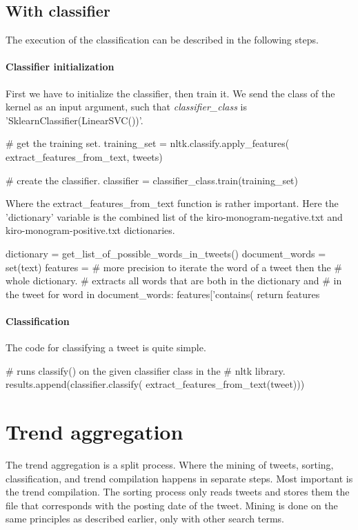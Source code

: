 \subsection{With classifier}\label{code:classifier_classification}
The execution of the classification can be described in the following steps. 

\paragraph{Classifier initialization}
First we have to initialize the classifier, then train it. We send the class of
the kernel as an input argument, such that \textit{classifier\_class} is
'SklearnClassifier(LinearSVC())'.
\begin{python}
# get the training set.
training_set = nltk.classify.apply_features(
    extract_features_from_text,
    tweets)

# create the classifier.
classifier = classifier_class.train(training_set)
\end{python}

Where the extract\_features\_from\_text function is rather important. Here the
'dictionary' variable is the combined list of the kiro-monogram-negative.txt and
kiro-monogram-positive.txt dictionaries.
\begin{python}
dictionary = get_list_of_possible_words_in_tweets()
document_words = set(text)
features = {}
# more precision to iterate the word of a tweet then the 
# whole dictionary.
# extracts all words that are both in the dictionary and 
# in the tweet
for word in document_words:
    features['contains(%
return features
\end{python}

\paragraph{Classification}
The code for classifying a tweet is quite simple. 
\begin{python}
# runs classify() on the given classifier class in the 
# nltk library.
results.append(classifier.classify(
    extract_features_from_text(tweet)))
\end{python}

\section{Trend aggregation}\label{code:trend_aggregation}
The trend aggregation is a split process. Where the mining of tweets, sorting,
classification, and trend compilation happens in separate steps. Most important
is the trend compilation. The sorting process only reads tweets
and stores them the file that corresponds with the posting date of the tweet.
Mining is done on the same principles as described earlier, only with other
search terms. 

